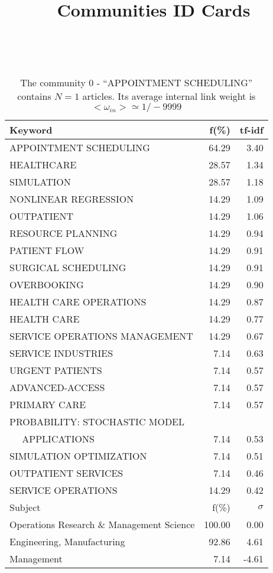 \documentclass[a4paper,11pt]{report}
\title{{\bf Communities ID Cards}}
\date{\begin{flushleft}This document gather the ``ID Cards'' of the CC communities found within your database.\\
 The CC network was built by keeping a link between articles sharing at least 5 references. The communities characterized here correspond to the ones found in the level 0 (in the sense of the Louvain algo) which gathers more than 0 articles.\\
 These ID cards displays the most frequent keywords, subject categories, journals of publication, institution, countries, authors, references and reference journals of the articles of each community. The significance of an item $\sigma = \sqrt{N} (f - p) / \sqrt{p(1-p)}$ [where $N$ is the number of articles within the community and $f$ and $p$ are the proportion of articles respectively within the community and within the database displaying that item ] is also given (for example $\sigma > 5$ is really highly significant). The tf-idf value which can be calculated by $tf-idf = f*log(frac{1}{p})$ is also given.\\
\vspace{1cm}
\copyright Sebastian Grauwin, Liu Weizhi - (2014) \end{flushleft}}
\begin{document}
\begin{landscape}
\maketitle
\clearpage

\begin{table}[!ht]
\caption{The community 0 - ``APPOINTMENT SCHEDULING'' contains $N = 1$ articles. Its average internal link weight is $<\omega_{in}> \simeq 1/-9999$ }
\textcolor{white}{aa}\\
{\scriptsize\begin{tabular}{|l r  r|}
\hline
Keyword & f(\%) & tf-idf \\
\hline
APPOINTMENT SCHEDULING & 64.29 & 3.40\\
HEALTHCARE & 28.57 & 1.34\\
SIMULATION & 28.57 & 1.18\\
NONLINEAR REGRESSION & 14.29 & 1.09\\
OUTPATIENT & 14.29 & 1.06\\
RESOURCE PLANNING & 14.29 & 0.94\\
PATIENT FLOW & 14.29 & 0.91\\
SURGICAL SCHEDULING & 14.29 & 0.91\\
OVERBOOKING & 14.29 & 0.90\\
HEALTH CARE OPERATIONS & 14.29 & 0.87\\
HEALTH CARE & 14.29 & 0.77\\
SERVICE OPERATIONS MANAGEMENT & 14.29 & 0.67\\
SERVICE INDUSTRIES & 7.14 & 0.63\\
URGENT PATIENTS & 7.14 & 0.57\\
ADVANCED-ACCESS & 7.14 & 0.57\\
PRIMARY CARE & 7.14 & 0.57\\
PROBABILITY: STOCHASTIC MODEL &  &\\
$\quad$ APPLICATIONS & 7.14 & 0.53\\
SIMULATION OPTIMIZATION & 7.14 & 0.51\\
OUTPATIENT SERVICES & 7.14 & 0.46\\
SERVICE OPERATIONS & 14.29 & 0.42\\
\hline
\hline
Subject & f(\%) & $\sigma$\\
\hline
Operations Research \& Management Science & 100.00 & 0.00\\
Engineering, Manufacturing & 92.86 & 4.61\\
Management & 7.14 & -4.61\\

\end{tabular}}
\end{table}
\end{landscape}
\end{document}
